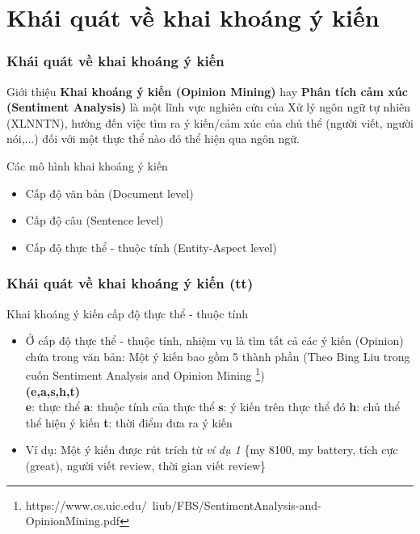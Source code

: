 \documentclass{beamer}
\begin{document}
	\section{Khái quát về khai khoáng ý kiến}
	\begin{frame}
		\frametitle{Khái quát về khai khoáng ý kiến}
		\begin{block}{Giới thiệu}
			\textbf{Khai khoáng ý kiến (Opinion Mining)} hay \textbf{Phân tích cảm xúc (Sentiment Analysis)} là một lĩnh vực nghiên cứu của Xử lý ngôn ngữ tự nhiên (XLNNTN), hướng đến việc tìm ra ý kiến/cảm xúc của chủ thể (người viết, người nói,...) đối với một thực thể nào đó thể hiện qua ngôn ngữ.
		\end{block}
		\begin{block}{Các mô hình khai khoáng ý kiến}			
			\begin{itemize}
				\item{Cấp độ văn bản (Document level)}
				\item{Cấp độ câu (Sentence level)}
				\item{Cấp độ thực thể - thuộc tính (Entity-Aspect level)}
			\end{itemize}
		\end{block}
	\end{frame}

	\begin{frame}
		\frametitle{Khái quát về khai khoáng ý kiến (tt)}
		\begin{block}{Khai khoáng ý kiến cấp độ thực thể - thuộc tính}
			\begin{itemize}
				\item{Ở cấp độ thực thể - thuộc tính, nhiệm vụ là tìm tất cả các ý kiến (Opinion) chứa trong văn bản: Một ý kiến bao gồm 5 thành phần (Theo Bing Liu trong cuốn Sentiment Analysis and Opinion Mining \footnote{https://www.cs.uic.edu/~liub/FBS/SentimentAnalysis-and-OpinionMining.pdf})
				\\\textbf{(e,a,s,h,t)}
				\\\textbf{e}: thực thể
				\textbf{a}: thuộc tính của thực thể
				\textbf{s}: ý kiến trên thực thể đó
				\textbf{h}: chủ thể thể hiện ý kiến
				\textbf{t}: thời điểm đưa ra ý kiến}

				\item{Ví dụ: Một ý kiến được rút trích từ \textit{ví dụ 1} \{my 8100, my battery, tích cực (great), người viết review, thời gian viết review\}}
			\end{itemize}
		\end{block}		
	\end{frame}
\end{document}
